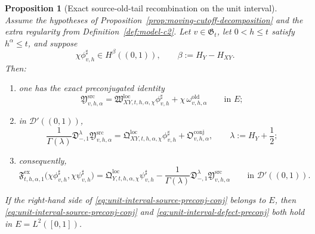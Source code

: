 \documentclass[11pt,a4paper]{amsart}
\theoremstyle{plain}
\newtheorem{proposition}[theorem]{Proposition}
\theoremstyle{definition}
\theoremstyle{remark}
\begin{document}
\begin{proposition}[Exact source-old-tail recombination on the unit interval]
\label{prop:unit-interval-source-preconj}
Assume the hypotheses of Proposition~\ref{prop:moving-cutoff-decomposition} and the extra regularity
from Definition~\ref{def:model-c2}. Let \(v\in\mathfrak G_t\), let \(0<h\le t\) satisfy
\(h^\alpha\le t\), and suppose
\[
\chi\phi_{v,h}^{\sharp}\in H^\beta((0,1)),
\qquad
\beta:=H_Y-H_{XY}.
\]
Then:
\begin{enumerate}[label=(\roman*)]
\item one has the exact preconjugated identity
\begin{equation}\label{eq:unit-interval-source-preconj-id}
\mathfrak Y_{v,h,\alpha}^{\mathrm{src}}
=
\mathfrak W_{XY,t,h,\alpha,\chi}^{\mathrm{loc}}\phi_{v,h}^{\sharp}
+
\chi\,\omega_{v,h,\alpha}^{\mathrm{old}}
\qquad\text{in }E;
\end{equation}
\item in \(\mathcal D'((0,1))\),
\begin{equation}\label{eq:unit-interval-source-preconj-conj}
\frac{1}{\Gamma(\lambda)}
\mathfrak D_{-,1}^{\lambda}
\mathfrak Y_{v,h,\alpha}^{\mathrm{src}}
=
\mathfrak Q_{XY,t,h,\alpha,\chi}^{\mathrm{loc}}\phi_{v,h}^{\sharp}
+
\mathfrak O_{v,h,\alpha}^{\mathrm{conj}},
\qquad
\lambda:=H_Y+\frac12;
\end{equation}
\item consequently,
\begin{equation}\label{eq:unit-interval-defect-preconj}
\mathfrak F_{t,h,\alpha,1}^{\mathrm{ex}}
\bigl(
\chi\phi_{v,h}^{\sharp},
\chi\psi_{v,h}^{\sharp}
\bigr)
=
\mathfrak Q_{Y,t,h,\alpha,\chi}^{\mathrm{loc}}\psi_{v,h}^{\sharp}
-
\frac{1}{\Gamma(\lambda)}
\mathfrak D_{-,1}^{\lambda}
\mathfrak Y_{v,h,\alpha}^{\mathrm{src}}
\qquad\text{in }\mathcal D'((0,1)).
\end{equation}
\end{enumerate}
If the right-hand side of \eqref{eq:unit-interval-source-preconj-conj} belongs to \(E\), then
\eqref{eq:unit-interval-source-preconj-conj} and \eqref{eq:unit-interval-defect-preconj} both hold in
\(E=L^2([0,1])\).
\end{proposition}
\end{document}
